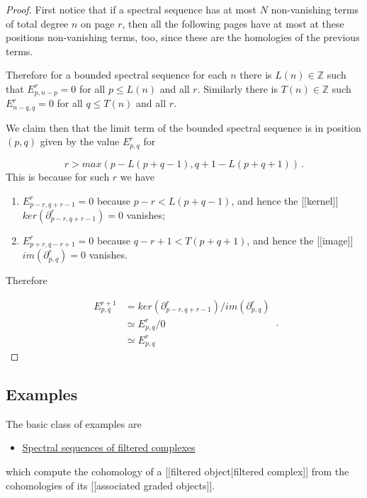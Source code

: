 \documentclass[12pt,titlepage]{article}
\newcommand{\gt}{>}
\newcommand{\lt}{<}
\theoremstyle{plain}
\theoremstyle{definition}
\theoremstyle{remark}
\begin{document}
\begin{proof}
First notice that if a spectral sequence has at most $N$ non-vanishing terms of total degree $n$ on page $r$, then all the following pages have at most at these positions non-vanishing terms, too, since these are the homologies of the previous terms.

Therefore for a bounded spectral sequence for each $n$ there is $L(n) \in \mathbb{Z}$ such that $E^r_{p,n-p} = 0$ for all $p \leq L(n)$ and all $r$. Similarly there is $T(n) \in \mathbb{Z}$ such $E^r_{n-q,q} = 0$ for all $q \leq T(n)$ and all $r$.

We claim then that the limit term of the bounded spectral sequence is in position $(p,q)$ given by the value $E^r_{p,q}$ for

\begin{displaymath}
r \gt max(  p-L(p+q-1), q + 1 - L(p+q+1) )
  \,.
\end{displaymath}
This is because for such $r$ we have

\begin{enumerate}%
\item $E^r_{p-r, q+r-1} = 0$ because $p-r \lt L(p+q-1)$, and hence the [[kernel]] $ker(\partial^r_{p-r,q+r-1}) = 0$ vanishes;


\item $E^r_{p+r, q-r+1} = 0$ because $q-r + 1 \lt T(p+q+1)$, and hence the [[image]] $im(\partial^r_{p,q}) = 0$ vanishes.



\end{enumerate}
Therefore

\begin{displaymath}
\begin{aligned}
    E^{r+1}_{p,q} 
    &= 
    ker(\partial^r_{p-r,q+r-1})/im(\partial^r_{p,q})
    \\
    & \simeq E^r_{p,q}/0
    \\
    & \simeq E^r_{p,q}
  \end{aligned}
  \,.
\end{displaymath}
\end{proof}
\hypertarget{Examples}{}\subsection*{{Examples}}\label{Examples}

The basic class of examples are

\begin{itemize}%
\item \hyperlink{SpectralSequenceOfFilteredComplex}{Spectral sequences of filtered complexes}

\end{itemize}
which compute the cohomology of a [[filtered object|filtered complex]] from the cohomologies of its [[associated graded objects]].
\end{document}
